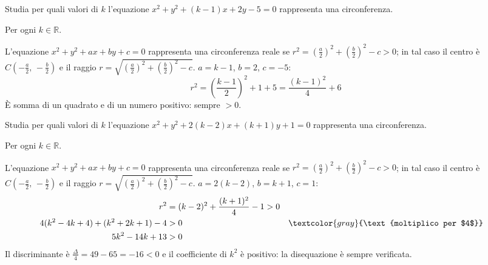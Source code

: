 \begin{question}[ID=1.3, subtitle={Valori di $k$ per la forma canonica della circonferenza}, difficulty=media, tags={circonferenza, parametri}]
Studia per quali valori di $k$ l'equazione $x^2+y^2+(k-1)x+2y-5=0$ rappresenta una circonferenza.
\begin{solution}
Per ogni $k\in\mathbb{R}$.
\end{solution}
\begin{explanation}
L'equazione $x^2+y^2+ax+by+c=0$ rappresenta una circonferenza reale se $r^2=\left(\tfrac a2\right)^2+\left(\tfrac b2\right)^2-c>0$; in tal caso il centro è $C\left(-\tfrac a2,\,-\tfrac b2\right)$ e il raggio $r=\sqrt{\left(\tfrac a2\right)^2+\left(\tfrac b2\right)^2-c}$.
$a=k-1$, $b=2$, $c=-5$:
\[ r^2=\left(\dfrac{k-1}{2}\right)^2+1+5=\dfrac{(k-1)^2}{4}+6 \]
È somma di un quadrato e di un numero positivo: sempre $>0$.
\end{explanation}
\end{question}


\begin{question}[ID=1.4, subtitle={Intervallo di $k$ per cui esiste la circonferenza}, difficulty=media, tags={circonferenza, parametri}]
Studia per quali valori di $k$ l'equazione $x^2+y^2+2(k-2)x+(k+1)y+1=0$ rappresenta una circonferenza.
\begin{solution}
Per ogni $k\in\mathbb{R}$.
\end{solution}
\begin{explanation}
L'equazione $x^2+y^2+ax+by+c=0$ rappresenta una circonferenza reale se $r^2=\left(\tfrac a2\right)^2+\left(\tfrac b2\right)^2-c>0$; in tal caso il centro è $C\left(-\tfrac a2,\,-\tfrac b2\right)$ e il raggio $r=\sqrt{\left(\tfrac a2\right)^2+\left(\tfrac b2\right)^2-c}$.
$a=2(k-2)$, $b=k+1$, $c=1$:
\[\begin{aligned}
r^2 &= (k-2)^2+\dfrac{(k+1)^2}{4}-1>0\\
4(k^2-4k+4)+(k^2+2k+1)-4 &> 0 && \textcolor{gray}{\text{moltiplico per $4$}}\\
5k^2-14k+13 &> 0
\end{aligned}\]
Il discriminante è $\tfrac\Delta4=49-65=-16<0$ e il coefficiente di $k^2$ è positivo: la disequazione è sempre verificata.
\end{explanation}
\end{question}


